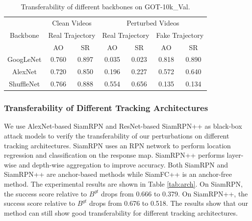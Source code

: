 \documentclass{article}
\begin{document}
\begin{table}[htpb]
\begin{center}
\scriptsize
\tabcolsep=2.0pt
\begin{tabular}{c|cc|cc|cc} 
\toprule
\multirow{3}{*}[-6pt]{Backbone} & \multicolumn{2}{c|}{Clean Videos}    & \multicolumn{4}{c}{Perturbed Videos}                                        \\ 
\cmidrule{2-7}
                          & \multicolumn{2}{c|}{Real Trajectory} & \multicolumn{2}{c|}{Real Trajectory} & \multicolumn{2}{c}{Fake Trajectory}  \\ 
\cmidrule{2-7}
                          & AO    & SR                           & AO    & SR                           & AO    & SR                           \\ 
\midrule
GoogLeNet                 & 0.760 & 0.897                        & 0.035 & 0.023                        & 0.818 & 0.890                        \\
AlexNet                   & 0.720 & 0.850                        & 0.196 & 0.227                        & 0.572 & 0.640                        \\
ShuffleNet                & 0.766 & 0.888                        & 0.554 & 0.656                        & 0.135 & 0.134                        \\
\bottomrule
\end{tabular}
\end{center}
\caption{Transferability of different backbones on GOT-10k\_Val.}
\label{tab:backbone}
\end{table}

\subsubsection{Transferability of Different Tracking Architectures}

We use AlexNet-based SiamRPN \cite{SiamRPN} and ResNet-based SiamRPN++ \cite{SiamRPN++} as black-box attack models to verify the transferability of our perturbations on different tracking architectures.
SiamRPN uses an RPN network to perform location regression and classification on the response map. SiamRPN++ performs layer-wise and depth-wise aggregation to improve accuracy. Both SiamRPN and SiamRPN++ are anchor-based methods while SiamFC++ is an anchor-free method.
The experimental results are shown in Table \ref{tab:arch}. On SiamRPN, the success score relative to $B^{gt}$ drops from 0.666 to 0.379. On SiamRPN++, the success score relative to $B^{gt}$ drops from 0.676 to 0.518. The results show that our method can still show good transferability for different tracking architectures.
\end{document}
